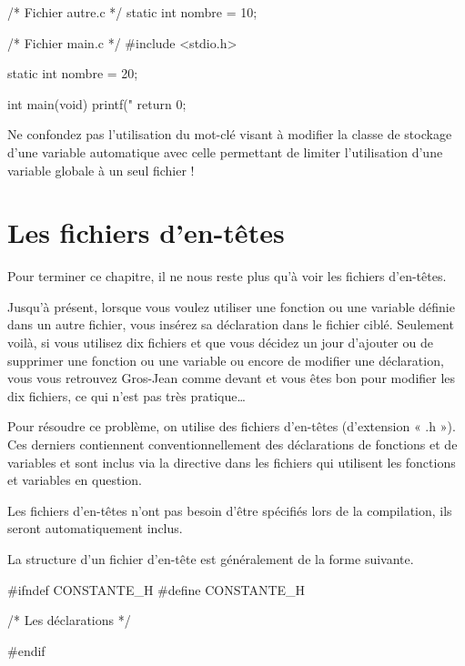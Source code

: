 \begin{C}
/* Fichier autre.c */
static int nombre = 10;
\end{C}

\begin{C}
/* Fichier main.c */
#include <stdio.h>

static int nombre = 20;

int main(void)
{
    printf("%
    return 0;
}
\end{C}

\begin{erreurbox}
Ne confondez pas l'utilisation du mot-clé
 visant à modifier la classe de stockage d'une variable
automatique avec celle permettant de limiter l'utilisation d'une
variable globale à un seul fichier !
\end{erreurbox}


\section{Les fichiers d'en-têtes }
\label{les-fichiers-den-têtes }

Pour terminer ce chapitre,
il ne nous reste plus qu'à voir les fichiers d'en-têtes.

Jusqu'à présent, lorsque vous voulez utiliser une fonction ou une
variable définie dans un autre fichier, vous insérez sa déclaration dans
le fichier ciblé. Seulement voilà, si vous utilisez dix fichiers et que
vous décidez un jour d'ajouter ou de supprimer une fonction ou une
variable ou encore de modifier une déclaration, vous vous retrouvez
Gros-Jean comme devant et vous êtes bon pour modifier les dix fichiers,
ce qui n'est pas très pratique\ldots{}

Pour résoudre ce problème, on utilise des fichiers d'en-têtes
(d'extension « .h »). Ces derniers contiennent conventionnellement des
déclarations de fonctions et de variables et sont inclus via la
directive  dans les fichiers qui utilisent les
fonctions et variables en question.

\begin{infobox}
 Les fichiers d'en-têtes n'ont pas
besoin d'être spécifiés lors de la compilation, ils seront
automatiquement inclus.
\end{infobox}


La structure d'un fichier d'en-tête est généralement de la forme
suivante.

\begin{C}
#ifndef CONSTANTE_H
#define CONSTANTE_H

/* Les déclarations */

#endif

\end{C}

